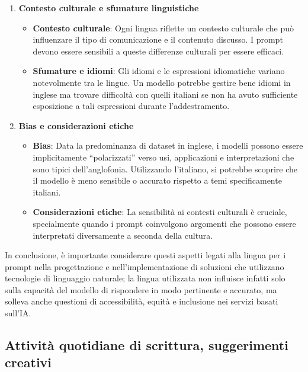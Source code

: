 \begin{enumerate}
                \item \textbf{Contesto culturale e sfumature linguistiche }
                \begin{itemize}
                    \item \textbf{Contesto culturale}: Ogni lingua riflette un contesto culturale che può influenzare il tipo di comunicazione e il contenuto discusso. I prompt devono essere sensibili a queste differenze culturali per essere efficaci.
                
                    \item \textbf{Sfumature e idiomi}: Gli idiomi e le espressioni idiomatiche variano notevolmente tra le lingue. Un modello potrebbe gestire bene idiomi in inglese ma trovare difficoltà con quelli italiani se non ha avuto sufficiente esposizione a tali espressioni durante l'addestramento.
                \end{itemize}
                
                \item \textbf{Bias e considerazioni etiche }
                \begin{itemize}
                    \item \textbf{Bias}: Data la predominanza di dataset in inglese, i modelli possono essere implicitamente ``polarizzati'' verso usi, applicazioni e interpretazioni che sono tipici dell'anglofonia. Utilizzando l'italiano, si potrebbe scoprire che il modello è meno sensibile o accurato rispetto a temi specificamente italiani.
                
                    \item \textbf{Considerazioni etiche}: La sensibilità ai contesti culturali è cruciale, specialmente quando i prompt coinvolgono argomenti che possono essere interpretati diversamente a seconda della cultura.
                \end{itemize}
            \end{enumerate}
            
            In conclusione, è importante considerare questi aspetti legati alla lingua per i prompt nella progettazione e nell'implementazione di soluzioni che utilizzano tecnologie di linguaggio naturale; la lingua utilizzata non influisce infatti solo sulla capacità del modello di rispondere in modo pertinente e accurato, ma solleva anche questioni di accessibilità, equità e inclusione nei servizi basati sull'IA.
        
    \subsection{Attività quotidiane di scrittura, suggerimenti creativi}
    
